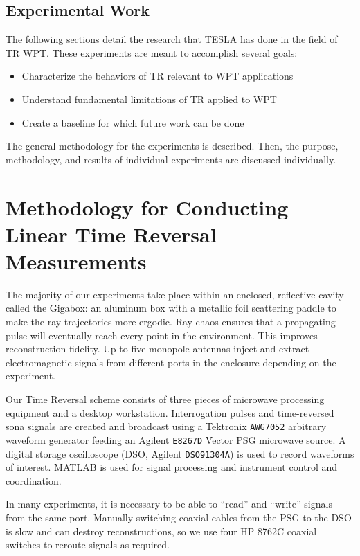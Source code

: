 \section{Experimental Work}
The following sections detail the research that TESLA has done in the field of TR WPT. These experiments are meant to accomplish several goals:

\begin{itemize}
    \item Characterize the behaviors of TR relevant to WPT applications
    \item Understand fundamental limitations of TR applied to WPT
    \item Create a baseline for which future work can be done
\end{itemize}

The general methodology for the experiments is described. Then, the purpose, methodology, and results of individual experiments are discussed individually.

\chapter{Methodology for Conducting Linear Time Reversal Measurements}
\label{ch:linear-meth}

The majority of our experiments take place within an enclosed, reflective cavity called the Gigabox: an aluminum box with a metallic foil scattering paddle to make the ray trajectories more ergodic. Ray chaos ensures that a propagating pulse will eventually reach every point in the environment. This improves reconstruction fidelity. Up to five monopole antennas inject and extract electromagnetic signals from different ports in the enclosure depending on the experiment.

Our Time Reversal scheme consists of three pieces of microwave processing equipment and a desktop workstation. Interrogation pulses and time-reversed sona signals are created and broadcast using a Tektronix \texttt{AWG7052} arbitrary waveform generator feeding an Agilent \texttt{E8267D} Vector PSG microwave source. A digital storage oscilloscope (DSO, Agilent \texttt{DSO91304A}) is used to record waveforms of interest. MATLAB is used for signal processing and instrument control and coordination.

In many experiments, it is necessary to be able to ``read'' and ``write'' signals from the same port. Manually switching coaxial cables from the PSG to the DSO is slow and can destroy reconstructions, so we use four HP 8762C coaxial switches to reroute signals as required.

